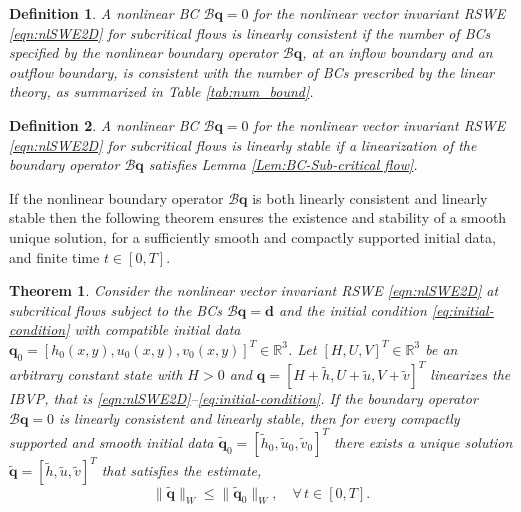 \documentclass{article}
\numberwithin{equation}{section}
\newtheorem{theorem}{Theorem}
\newtheorem{definition}{Definition}
\theoremstyle{definition}
\begin{document}
%
\begin{definition}\label{def:linear-consistency}
    A nonlinear BC $\mathcal{B}\mathbf{q}=0$ for the nonlinear vector invariant RSWE \eqref{eqn:nlSWE2D} for subcritical flows is linearly consistent if the number of BCs specified by the nonlinear boundary  operator $\mathcal{B}\mathbf{q}$, at an inflow boundary and an outflow boundary, is consistent with the number of BCs prescribed by the linear theory, as  summarized in Table \ref{tab:num_bound}.
\end{definition}
\begin{definition}\label{def:linear-stability}
    A nonlinear BC $\mathcal{B}\mathbf{q}=0$ for the nonlinear vector invariant RSWE \eqref{eqn:nlSWE2D} for subcritical flows is linearly stable if a linearization of the boundary  operator $\mathcal{B}\mathbf{q}$ satisfies  Lemma \ref{Lem:BC-Sub-critical flow}.
\end{definition}
\noindent
If the nonlinear boundary operator $\mathcal{B}\mathbf{q}$ is both linearly consistent and linearly stable then the following theorem ensures the existence and stability of a smooth unique solution, for a sufficiently smooth and compactly supported initial data, and finite time $t\in[0,T]$.
\begin{theorem}\label{theo:exitenceofuniquesmoothsolution}
    Consider the nonlinear vector invariant RSWE \eqref{eqn:nlSWE2D} at subcritical flows subject to the BCs $\mathcal{B}\mathbf{q}=\mathbf{d}$ and the initial condition \eqref{eq:initial-condition} with compatible initial data $\mathbf{q}_0=[h_0(x,y), u_0(x,y), v_0(x,y)]^T\in \mathbb{R}^3$. Let $[H, U, V]^T \in\mathbb{R}^3$ be an arbitrary constant state with $H>0$ and $\mathbf{q} = [H + \widetilde{h}, U + \widetilde{u}, V + \widetilde{v}]^T$ linearizes the IBVP, that is \eqref{eqn:nlSWE2D}--\eqref{eq:initial-condition}.  If the boundary operator $\mathcal{B}\mathbf{q}=0$  is linearly consistent and linearly stable, then for every compactly supported and smooth initial data $\widetilde{\mathbf{q}}_0=[\widetilde{h}_0,\widetilde{u}_0,\widetilde{v}_0]^T$ there exists a unique solution $\widetilde{\mathbf{q}} = [\widetilde{h}, \widetilde{u}, \widetilde{v}]^T$
    that satisfies the estimate,
$$
\|\widetilde{\mathbf{q}}\|_W \leq \|\widetilde{\mathbf{q}}_0\|_W, \quad \forall \, t \in [0, T].
$$
\end{theorem}
\end{document}
